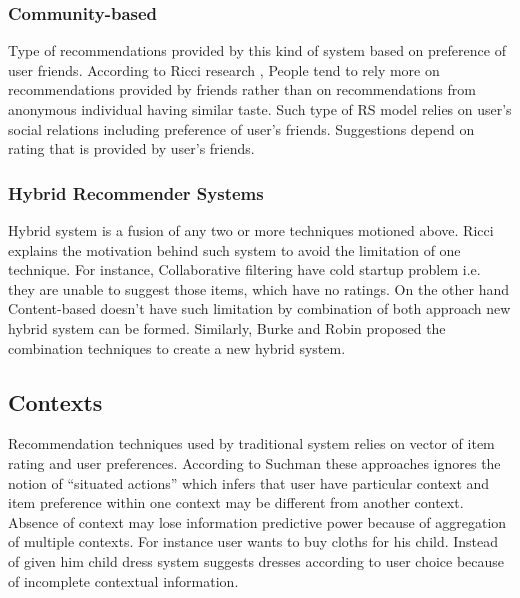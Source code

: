 \subsubsection{Community-based}

Type of recommendations provided by this kind of system based on preference of user friends. According to Ricci research \cite{ricci2011introduction}, People tend to rely more on recommendations provided by friends rather than on recommendations from anonymous individual having similar taste. Such type of RS model relies on user’s social relations including preference of user’s friends. Suggestions depend on rating that is provided by user’s friends.

\subsubsection{Hybrid Recommender Systems}

Hybrid system is a fusion of any two or more techniques motioned above. Ricci \cite{ricci2011introduction} explains the motivation behind such system to avoid the limitation of one technique. For instance, Collaborative filtering have cold startup problem i.e. they are unable to suggest those items, which have no ratings. On the other hand Content-based doesn’t have such limitation by combination of both approach new hybrid system can be formed. Similarly, Burke and Robin \cite{burke2007hybrid} proposed the combination techniques to create a new hybrid system.

\subsection{Contexts}
Recommendation techniques used by traditional system relies on vector of item rating and user preferences. According to Suchman \cite{suchman1986plans} these approaches ignores the notion of “situated actions” which infers that user have particular context and item preference within one context may be different from another context\cite{adomavicius2011context}.
Absence of context may lose information predictive power because of aggregation of multiple contexts. For instance user wants to buy cloths for his child. Instead of given him child dress system suggests dresses according to user choice because of incomplete contextual information.\newline

